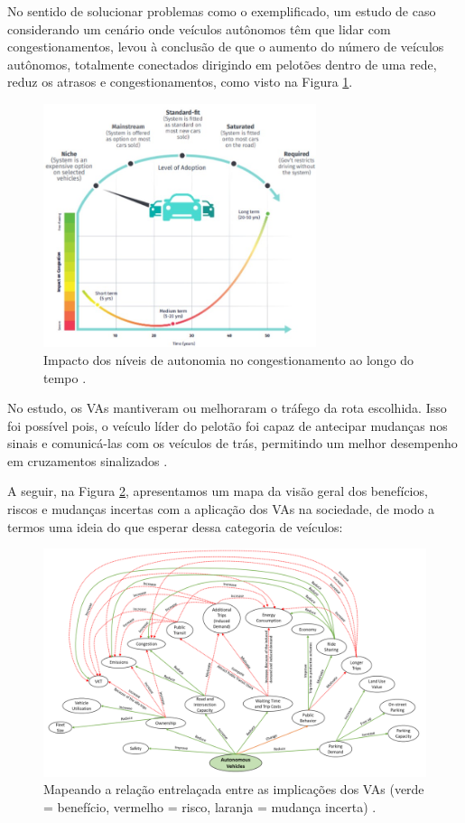 No sentido de solucionar problemas como o exemplificado, um estudo de caso considerando um cenário onde veículos autônomos têm que lidar com congestionamentos, levou à conclusão de que o aumento do número de veículos autônomos, totalmente conectados dirigindo em pelotões dentro de uma rede, reduz os atrasos e congestionamentos, como visto na Figura \ref{congestionamento}. 

\begin{figure}[H]
\centering
\includegraphics[width=8cm]{Figures/conge.jpg}
\caption{Impacto dos níveis de autonomia no congestionamento ao longo do tempo \cite{4cenarios_ocidental}.}
\label{congestionamento}
\end{figure}

No estudo, os VAs mantiveram ou melhoraram o tráfego da rota escolhida. Isso foi possível pois, o veículo líder do pelotão foi capaz de antecipar mudanças nos sinais e comunicá-las com os veículos de trás, permitindo um melhor desempenho em cruzamentos sinalizados \cite{conge}.

A seguir, na Figura \ref{mapa_resumo}, apresentamos um mapa da visão geral dos benefícios, riscos e mudanças incertas com a aplicação dos VAs na sociedade, de modo a termos uma ideia do que esperar dessa categoria de veículos:

\begin{figure}[H]
\centering
\includegraphics[width=16cm]{Figures/map.png}
\caption{Mapeando a relação entrelaçada entre as implicações dos VAs (verde = benefício, vermelho = risco, laranja = mudança incerta) \cite{mundobrasil}.}
\label{mapa_resumo}
\end{figure}


